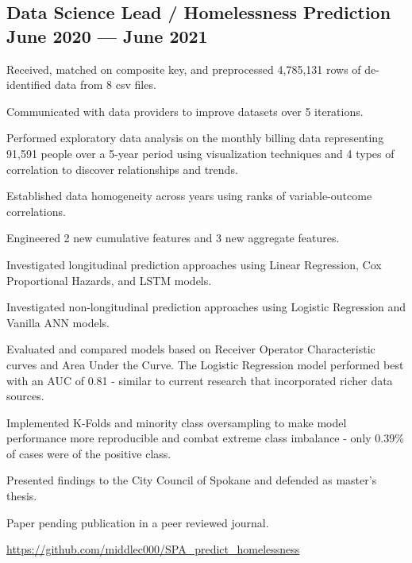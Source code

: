 \documentclass[letter,10pt]{article}
\begin{document}
\newpage
\subsection{{Data Science Lead / Homelessness Prediction \hfill June 2020 --- June 2021}}
\begin{zitemize}
    \item Received, matched on composite key, and preprocessed 4,785,131 rows of de-identified data from 8 csv files.
    \item Communicated with data providers to improve datasets over 5 iterations.
    \item Performed exploratory data analysis on the monthly billing data representing 91,591 people over a 5-year period using visualization techniques and 4 types of correlation to discover relationships and trends.
    \item Established data homogeneity across years using ranks of variable-outcome correlations.
    \item Engineered 2 new cumulative features and 3 new aggregate features.
    \item Investigated longitudinal prediction approaches using Linear Regression, Cox Proportional Hazards, and LSTM models.
    \item Investigated non-longitudinal prediction approaches using Logistic Regression and Vanilla ANN models.
    \item Evaluated and compared models based on Receiver Operator Characteristic curves and Area Under the Curve. The Logistic Regression model performed best with an AUC of 0.81 - similar to current research that incorporated richer data sources.
    \item Implemented K-Folds and minority class oversampling to make model performance more reproducible and combat extreme class imbalance - only 0.39\% of cases were of the positive class.
    \item Presented findings to the City Council of Spokane and defended as master's thesis.
    \item Paper pending publication in a peer reviewed journal.
    \item \url{https://github.com/middlec000/SPA_predict_homelessness}
\end{zitemize}
\end{document}
